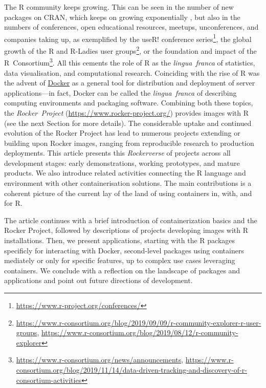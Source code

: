 The R community keeps growing. This can be seen in the number of new
packages on CRAN, which keeps on growing exponentially
\citep{cran:2019}, but also in the numbers of conferences, open
educational resources, meetups, unconferences, and companies taking up,
as exemplified by the useR! conference
series\footnote{\href{https://www.r-project.org/conferences/}{https://www.r-project.org/conferences/}},
the global growth of the R and R-Ladies user
groups\footnote{\href{https://www.r-consortium.org/blog/2019/09/09/r-community-explorer-r-user-groups}{https://www.r-consortium.org/blog/2019/09/09/r-community-explorer-r-user-groups}, \href{https://www.r-consortium.org/blog/2019/08/12/r-community-explorer}{https://www.r-consortium.org/blog/2019/08/12/r-community-explorer}},
or the foundation and impact of the
R~Consortium\footnote{\href{https://www.r-consortium.org/news/announcements}{https://www.r-consortium.org/news/announcements}, \href{https://www.r-consortium.org/blog/2019/11/14/data-driven-tracking-and-discovery-of-r-consortium-activities}{https://www.r-consortium.org/blog/2019/11/14/data-driven-tracking-and-discovery-of-r-consortium-activities}}.
All this cements the role of R as the \emph{lingua~franca} of
statistics, data visualisation, and computational research. Coinciding
with the rise of R was the advent of
\href{https://en.wikipedia.org/wiki/Docker_(software)}{Docker} as a
general tool for distribution and deployment of server applications---in
fact, Docker can be called the \emph{lingua~franca} of describing
computing environments and packaging software. Combining both these
topics, the \emph{Rocker~Project}
(\url{https://www.rocker-project.org/}) provides images with R (see the
next Section for more details). The considerable uptake and continued
evolution of the Rocker Project has lead to numerous projects extending
or building upon Rocker images, ranging from reproducible research to
production deployments. This article presents this \emph{Rockerverse} of
projects across all development stages: early demonstrations, working
prototypes, and mature products. We also introduce related activities
connecting the R language and environment with other containerisation
solutions. The main contributions is a coherent picture of the current
lay of the land of using containers in, with, and for R.

The article continues with a brief introduction of containerization
basics and the Rocker Project, followed by descriptions of projects
developing images with R installations. Then, we present applications,
starting with the R packages specificly for interacting with Docker,
second-level packages using containers mediately or only for specific
features, up to complex use cases leveraging containers. We conclude
with a reflection on the landscape of packages and applications and
point out future directions of development.

